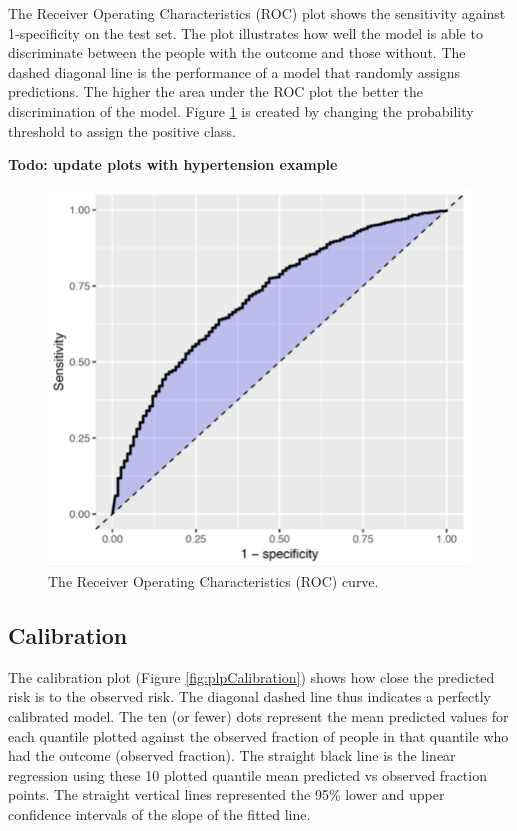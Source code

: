 \documentclass[]{book}
\begin{document}
The Receiver Operating Characteristics (ROC) plot shows the sensitivity
against 1-specificity on the test set. The plot illustrates how well the
model is able to discriminate between the people with the outcome and
those without. The dashed diagonal line is the performance of a model
that randomly assigns predictions. The higher the area under the ROC
plot the better the discrimination of the model. Figure \ref{fig:roc} is
created by changing the probability threshold to assign the positive
class.

\textbf{Todo: update plots with hypertension example}

\begin{figure}

{\centering \includegraphics[width=0.8\linewidth]{images/PatientLevelPrediction/sparseROC} 

}

\caption{The Receiver Operating Characteristics (ROC) curve.}\label{fig:roc}
\end{figure}

\subsection{Calibration}\label{calibration}

The calibration plot (Figure \ref{fig:plpCalibration}) shows how close
the predicted risk is to the observed risk. The diagonal dashed line
thus indicates a perfectly calibrated model. The ten (or fewer) dots
represent the mean predicted values for each quantile plotted against
the observed fraction of people in that quantile who had the outcome
(observed fraction). The straight black line is the linear regression
using these 10 plotted quantile mean predicted vs observed fraction
points. The straight vertical lines represented the 95\% lower and upper
confidence intervals of the slope of the fitted line.
\end{document}
